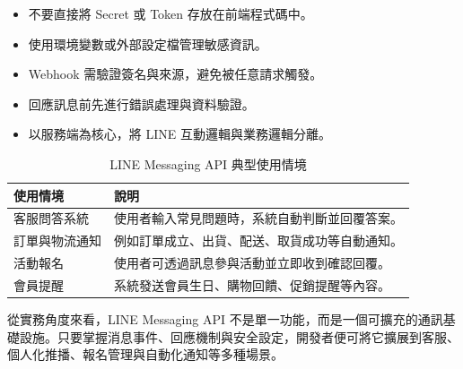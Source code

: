 \begin{itemize}[leftmargin=2em]
    \item 不要直接將 Secret 或 Token 存放在前端程式碼中。
    \item 使用環境變數或外部設定檔管理敏感資訊。
    \item Webhook 需驗證簽名與來源，避免被任意請求觸發。
    \item 回應訊息前先進行錯誤處理與資料驗證。
    \item 以服務端為核心，將 LINE 互動邏輯與業務邏輯分離。
\end{itemize}

\begin{table}[H]
    \centering
    \caption{LINE Messaging API 典型使用情境}
    \begin{tabular}{|p{4cm}|p{8cm}|}
        \hline
        \textbf{使用情境} & \textbf{說明} \\
        \hline
        客服問答系統 & 使用者輸入常見問題時，系統自動判斷並回覆答案。 \\
        \hline
        訂單與物流通知 & 例如訂單成立、出貨、配送、取貨成功等自動通知。 \\
        \hline
        活動報名 & 使用者可透過訊息參與活動並立即收到確認回覆。 \\
        \hline
        會員提醒 & 系統發送會員生日、購物回饋、促銷提醒等內容。 \\
        \hline
    \end{tabular}
\end{table}

從實務角度來看，LINE Messaging API 不是單一功能，而是一個可擴充的通訊基礎設施。只要掌握消息事件、回應機制與安全設定，開發者便可將它擴展到客服、個人化推播、報名管理與自動化通知等多種場景。

